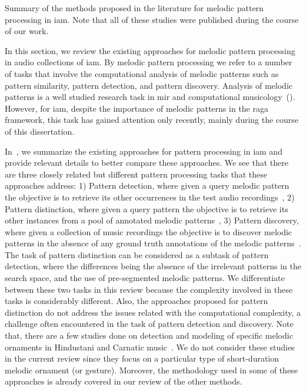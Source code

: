 \begin{table}
\begin{threeparttable}
\begin{tablenotes}
		\end{tablenotes}
		\caption[Summary of the melodic pattern processing methods for \gls{iam}]{Summary of the methods proposed in the literature for melodic pattern processing in \gls{iam}. Note that all of these studies were published during the course of our work.}
		\label{tab:pattern_processing_iam}
	\end{threeparttable}
\end{table}

In this section, we review the existing approaches for melodic pattern processing in audio collections of \gls{iam}. By melodic pattern processing we refer to a number of tasks that involve the computational analysis of melodic patterns such as pattern similarity, pattern detection, and pattern discovery. Analysis of melodic patterns is a well studied research task in \gls{mir} and computational musicology~(). However, for \gls{iam}, despite the importance of melodic patterns in the \gls{raga} framework, this task has gained attention only recently, mainly during the course of this dissertation. 

In~, we summarize the existing approaches for pattern processing in \gls{iam} and provide relevant details to better compare these approaches. We see that there are three closely related but different pattern processing tasks that these approaches address: 1) Pattern detection, where given a query melodic pattern the objective is to retrieve its other occurrences in the test audio recordings~\citep{Ross2012,Ross2012b,Ishwar2013,dutta2014modified,ganguli2015efficient}, 2) Pattern distinction, where given a query pattern the objective is to retrieve its other instances from a pool of annotated melodic patterns~\citep{ishwar2012motivic,rao2013distinguishing,Rao2014}, 3) Pattern discovery, where given a collection of music recordings the objective is to discover melodic patterns in the absence of any ground truth annotations of the melodic patterns~\citep{Dutta2014}. The task of pattern distinction can be considered as a subtask of pattern detection, where the differences being the absence of the irrelevant patterns in the search space, and the use of pre-segmented melodic patterns. We differentiate between these two tasks in this review because the complexity involved in these tasks is considerably different. Also, the approaches proposed for pattern distinction do not address the issues related with the computational complexity, a challenge often encountered in the task of pattern detection and discovery. Note that, there are a few studies done on detection and modeling of specific melodic ornaments in Hindustani and Carnatic music~\citep{Subramanian2012,Datta2007,narayan2014detection,pratyush_2010}. We do not consider these studies in the current review since they focus on a particular type of short-duration melodic ornament (or gesture). Moreover, the methodology used in some of these approaches is already covered in our review of the other methods.

